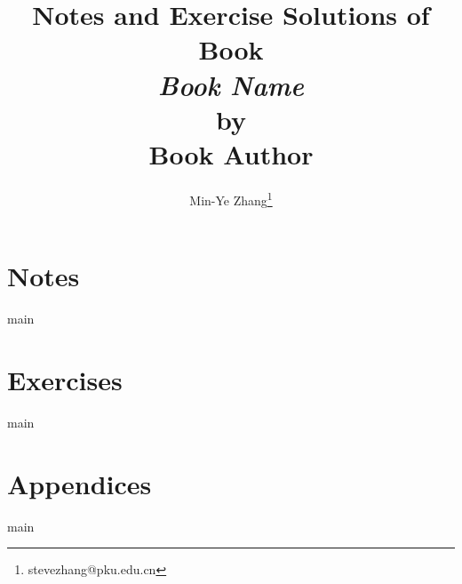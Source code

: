 \documentclass[a4paper,12pt]{report}
\newcommand{\booktitle}{Book Name}
\newcommand{\bookauthor}{Book Author}
\begin{document}
\title{Notes and Exercise Solutions of Book \\ \textit{\booktitle} \\ by \\ \bookauthor}
\author{Min-Ye Zhang\thanks{stevezhang@pku.edu.cn}}

\maketitle
\clearpage
\begingroup
\hypersetup{linkcolor=black}
\hypertarget{toc}{}%
\bookmark[dest=toc]{\contentsname}
\tableofcontents
\endgroup
\clearpage

\part{Notes}
{main}
\part{Exercises}
{main}

\part*{Appendices}
{main}

\end{document}
